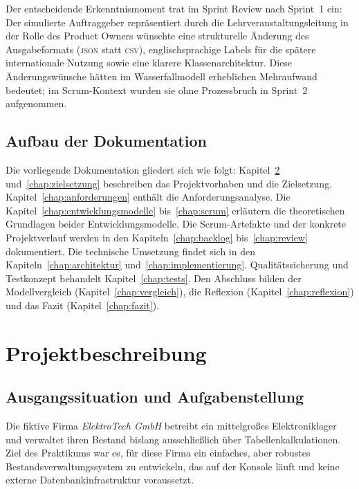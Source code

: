 \documentclass[12pt, a4paper, twoside]{report}
\newcommand{\json}{\textsc{json}}
\begin{document}
Der entscheidende Erkenntnismoment trat im Sprint Review nach Sprint~1 ein: Der simulierte
Auftraggeber \textemdash{} repräsentiert durch die Lehrveranstaltungsleitung in der Rolle des
Product Owners \textemdash{} wünschte eine strukturelle Änderung des Ausgabeformats (\json{}
statt \textsc{csv}), englischsprachige Labels für die spätere internationale Nutzung sowie
eine klarere Klassenarchitektur. Diese Änderungswünsche hätten im Wasserfallmodell erheblichen
Mehraufwand bedeutet; im Scrum-Kontext wurden sie ohne Prozessbruch in Sprint~2 aufgenommen.

\section{Aufbau der Dokumentation}

Die vorliegende Dokumentation gliedert sich wie folgt: Kapitel~\ref{chap:projektbeschreibung}
und~\ref{chap:zielsetzung} beschreiben das Projektvorhaben und die Zielsetzung.
Kapitel~\ref{chap:anforderungen} enthält die Anforderungsanalyse.
Die Kapitel~\ref{chap:entwicklungsmodelle} bis~\ref{chap:scrum} erläutern die theoretischen
Grundlagen beider Entwicklungsmodelle. Die Scrum-Artefakte und der konkrete Projektverlauf
werden in den Kapiteln~\ref{chap:backlog} bis~\ref{chap:review} dokumentiert.
Die technische Umsetzung findet sich in den Kapiteln~\ref{chap:architektur}
und~\ref{chap:implementierung}. Qualitätssicherung und Testkonzept behandelt
Kapitel~\ref{chap:tests}. Den Abschluss bilden der Modellvergleich (Kapitel~\ref{chap:vergleich}),
die Reflexion (Kapitel~\ref{chap:reflexion}) und das Fazit (Kapitel~\ref{chap:fazit}).

\chapter{Projektbeschreibung}
\label{chap:projektbeschreibung}

\section{Ausgangssituation und Aufgabenstellung}

Die fiktive Firma \textit{ElektroTech GmbH} betreibt ein mittelgroßes Elektroniklager und
verwaltet ihren Bestand bislang ausschließlich über Tabellenkalkulationen. Ziel des Praktikums
war es, für diese Firma ein einfaches, aber robustes Bestandsverwaltungssystem zu entwickeln,
das auf der Konsole läuft und keine externe Datenbankinfrastruktur voraussetzt.
\end{document}
